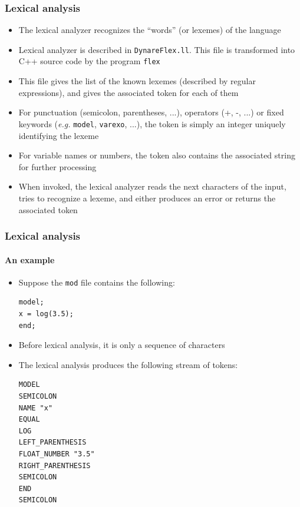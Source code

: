 \documentclass{beamer}
\begin{document}
\begin{frame}
\frametitle{Lexical analysis}
\begin{itemize}
\item The lexical analyzer recognizes the ``words'' (or \alert{lexemes}) of the language
\item Lexical analyzer is described in \texttt{DynareFlex.ll}. This file is transformed into C++ source code by the program \texttt{flex}
\item This file gives the list of the known lexemes (described by regular expressions), and gives the associated \alert{token} for each of them
\item For punctuation (semicolon, parentheses, ...), operators (+, -, ...) or fixed keywords (\textit{e.g.} \texttt{model}, \texttt{varexo}, ...), the token is simply an integer uniquely identifying the lexeme
\item For variable names or numbers, the token also contains the associated string for further processing
\item When invoked, the lexical analyzer reads the next characters of the input, tries to recognize a lexeme, and either produces an error or returns the associated token
\end{itemize}
\end{frame}

\begin{frame}[fragile]
\frametitle{Lexical analysis}
\framesubtitle{An example}
\begin{itemize}
\item Suppose the \texttt{mod} file contains the following:
\begin{verbatim}
model;
x = log(3.5);
end;
\end{verbatim}
\item Before lexical analysis, it is only a sequence of characters
\item The lexical analysis produces the following stream of tokens:

\begin{footnotesize}
\begin{verbatim}
MODEL
SEMICOLON
NAME "x"
EQUAL
LOG
LEFT_PARENTHESIS
FLOAT_NUMBER "3.5"
RIGHT_PARENTHESIS
SEMICOLON
END
SEMICOLON
\end{verbatim}
\end{footnotesize}
\end{itemize}
\end{frame}
\end{document}
